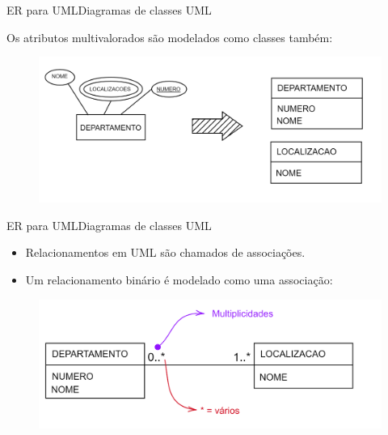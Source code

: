 \documentclass[t]{beamer}
\begin{document}

\begin{ftst}{ER para UML}{Diagramas de classes UML}

Os atributos multivalorados são modelados como classes também:
\vone
\begin{figure}
    \centering
    \includegraphics[scale=0.15]{Figuras/UML_2.png}

\end{figure}
\end{ftst}


\begin{ftst}{ER para UML}{Diagramas de classes UML}
\begin{itemize}
    \item Relacionamentos em UML são chamados de associações.
    \item Um relacionamento binário é modelado como uma associação:
\end{itemize}

\vone
\begin{figure}
    \centering
    \includegraphics[scale=0.15]{Figuras/UML_3.png}

\end{figure}
\end{ftst}

\end{document}
